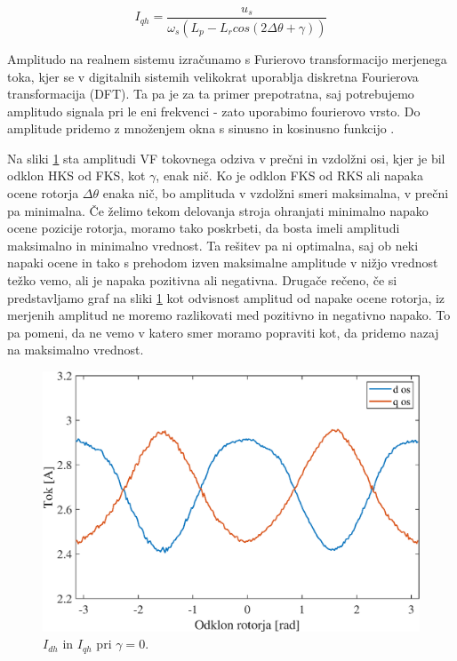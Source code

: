 \documentclass[a4paper,twoside,openright,12pt,slovene]{book}
\begin{document}
\begin{equation}\label{tokovniOdzivEnacbaQ}
    I_{qh} = \frac{u_s}{\omega_s (L_p - L_r cos(2\Delta\theta + \gamma))}
\end{equation}

Amplitudo na realnem sistemu izračunamo s Furierovo transformacijo merjenega toka, kjer se v digitalnih sistemih velikokrat uporablja diskretna Fourierova transformacija (DFT). Ta pa je za ta primer
prepotratna, saj potrebujemo amplitudo signala pri le eni frekvenci - zato uporabimo fourierovo vrsto. Do amplitude pridemo z množenjem okna s sinusno in kosinusno funkcijo
\cite{enwiki:fourierSeries}. 

Na sliki \ref{tokovniOdzivKot0} sta amplitudi VF tokovnega odziva v prečni in vzdolžni osi, kjer je bil odklon HKS od FKS, kot $\gamma$, enak nič. Ko je odklon FKS od RKS ali napaka ocene rotorja
$\Delta\theta$ enaka nič, bo amplituda v vzdolžni smeri maksimalna, v prečni pa minimalna. Če želimo tekom delovanja stroja ohranjati minimalno napako ocene pozicije rotorja, moramo tako poskrbeti, da
bosta imeli amplitudi maksimalno in minimalno vrednost. Ta rešitev pa ni optimalna, saj ob neki napaki ocene in tako s prehodom izven maksimalne amplitude v nižjo vrednost težko vemo, ali je napaka
pozitivna ali negativna. Drugače rečeno, če si predstavljamo graf na sliki \ref{tokovniOdzivKot0} kot odvisnost amplitud od napake ocene rotorja, iz merjenih amplitud ne moremo razlikovati med
pozitivno in negativno napako. To pa pomeni, da ne vemo v katero smer moramo popraviti kot, da pridemo nazaj na maksimalno vrednost.

\begin{figure}[!htbp]
    \centering
    \includegraphics[width=0.95\columnwidth]{Slike/tokovniOdzivKot0.eps}
    \caption{\label{tokovniOdzivKot0} $I_{dh}$ in $I_{qh}$ pri $\gamma = 0$.}
\end{figure}
\end{document}
